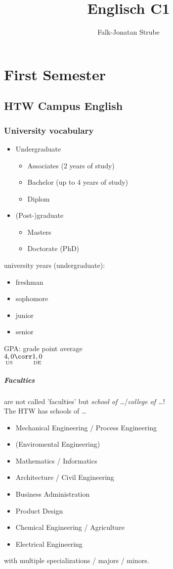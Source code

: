\documentclass{scrreprt}
\title{Englisch C1}
\author{Falk-Jonatan Strube}
\begin{document}
\maketitle
\tableofcontents

\chapter{First Semester}

\section{HTW Campus English}

\subsection*{University vocabulary}
\begin{itemize}
\item Undergraduate
\begin{itemize}[label=$\rightarrow$]
\item Associates (2 years of study)
\item Bachelor (up to 4 years of study)
\item Diplom
\end{itemize}
\item (Post-)graduate
\begin{itemize}[label=$\rightarrow$]
\item Masters
\item Doctorate (PhD)
\end{itemize}
\end{itemize}
university years (undergraduate):
\begin{itemize}
\item freshman
\item sophomore
\item junior
\item senior
\end{itemize}
GPA: grade point average\\
$\underset{\text{US}}{4,0}\corr \underset{\text{DE}}{1,0} $
\paragraph{Faculties} are not called 'faculties' but \emph{school of …}/\emph{college of …}!\\
The HTW has schools of …
\begin{itemize}
\item Mechanical Engineering / Process Engineering
\item (Enviromental Engineering)
\item Mathematics / Informatics
\item Architecture / Civil Engineering
\item Business Administration
\item Product Design
\item Chemical Engineering / Agriculture
\item Electrical Engineering
\end{itemize}
with multiple specializations / majors / minors.
\end{document}
